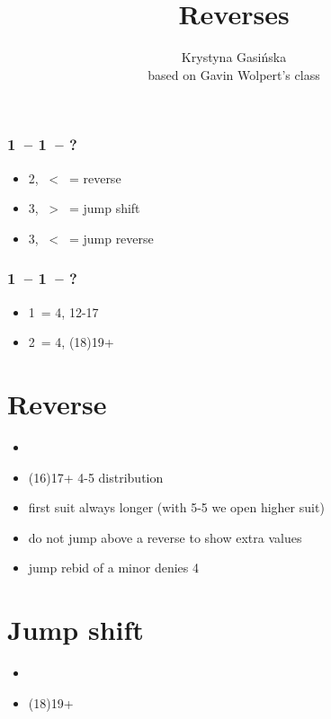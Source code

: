 \documentclass[12pt, a4paper]{article}
\title{Reverses}
\author{Krystyna Gasińska\\\small{based on Gavin Wolpert's class}}
\begin{document}
\maketitle


\subsubsection*{1\ -- 1\ -- ?}
\begin{itemize}
    \item 2, \ < \ = reverse
    \item 3, \ > \ = jump shift
    \item 3, \ < \ = jump reverse
\end{itemize}

\subsubsection*{1\mins\ -- 1\hearts\ -- ?}
\begin{itemize}
    \item 1\spades\ = 4\spades, 12-17
    \item 2\spades\ = 4\spades, (18)19+
\end{itemize}


\section{Reverse}
\begin{itemize}
    \item \fonce
    \item (16)17+ 4-5 distribution
    \item first suit always longer (with 5-5 we open higher suit)
    \item do not jump above a reverse to show extra values
    \item jump rebid of a minor denies 4\majs\ \vimp
\end{itemize}

\section{Jump shift}
\begin{itemize}
    \item \gf
    \item (18)19+
\end{itemize}
\end{document}
